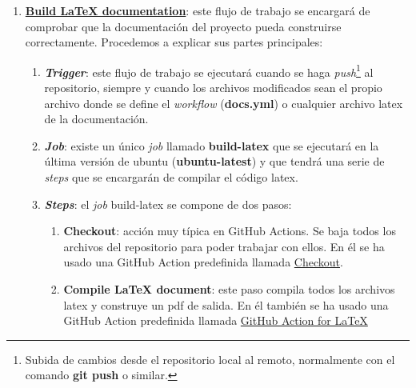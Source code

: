     \begin{enumerate}
        \item \textbf{\href{https://github.com/alexespana/TFG/actions/workflows/docs.yml}
        {Build LaTeX documentation}}: este flujo de trabajo se encargará de comprobar que
        la documentación del proyecto pueda construirse correctamente. Procedemos a
        explicar sus partes principales:
            \begin{enumerate}
                \item \textbf{\textit{Trigger}}: este flujo de trabajo se ejecutará cuando
                se haga \textit{push}\footnote{Subida de cambios desde el repositorio local
                al remoto, normalmente con el comando \textbf{git push} o similar.} al
                repositorio, siempre y cuando los archivos modificados sean el propio
                archivo donde se define el \textit{workflow} (\textbf{docs.yml}) o cualquier
                archivo latex de la documentación.
                \item \textbf{\textit{Job}}: existe un único \textit{job} llamado
                \textbf{build-latex} que se ejecutará en la última versión de ubuntu
                (\textbf{ubuntu-latest}) y que tendrá una serie de \textit{steps} que se
                encargarán de compilar el código latex.
                \item \textbf{\textit{Steps}}: el \textit{job} build-latex se compone de dos
                pasos:
                    \begin{enumerate}
                        \item \textbf{Checkout}: acción muy típica en GitHub Actions. Se baja
                        todos los archivos del repositorio para poder trabajar con ellos. En
                        él se ha usado una GitHub Action predefinida llamada
                        \href{https://github.com/marketplace/actions/checkout}{Checkout}.
                        \item \textbf{Compile LaTeX document}: este paso compila todos los
                        archivos latex y construye un pdf de salida. En él también se ha
                        usado una GitHub Action predefinida llamada
                        \href{https://github.com/marketplace/actions/github-action-for-latex}
                        {GitHub Action for LaTeX}
                    \end{enumerate}
            \end{enumerate}


\end{enumerate}
